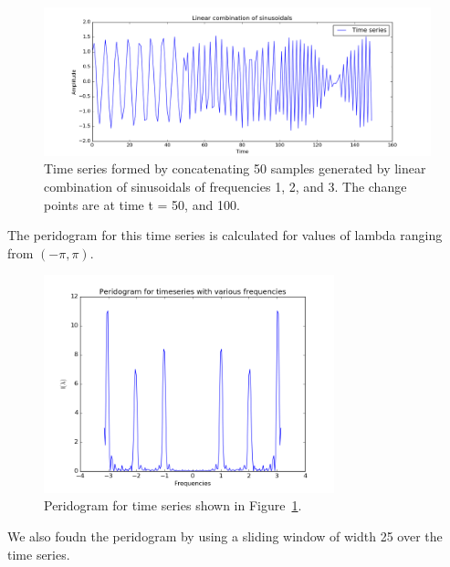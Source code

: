 \documentclass{article}
\begin{document}
\begin{figure}[ht!]
  \centering
  \includegraphics[width=1\textwidth]{images/spectral_density_2/ts2}
  \caption{Time series formed by concatenating 50 samples generated by linear combination of sinusoidals of frequencies 1, 2, and 3.  The change points are at time t = 50, and 100.\label{fig:sd2_ts2}}
\end{figure}

The peridogram for this time series is calculated for values of lambda ranging from $(-\pi, \pi)$.

\begin{figure}[ht!]
  \centering
  \includegraphics[width=0.75\textwidth]{images/spectral_density_2/peri2}
  \caption{Peridogram for time series shown in Figure~\ref{fig:sd2_ts2}.\label{fig:sd2_peri2}}
\end{figure}

We also foudn the peridogram by using a sliding window of width 25 over the time series.



\end{document}
